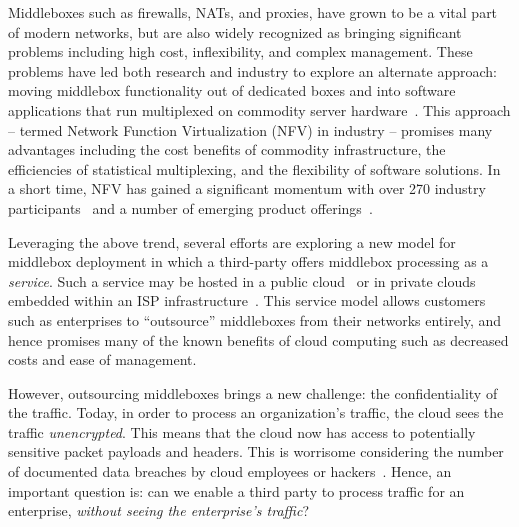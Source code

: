 




Middleboxes such as firewalls, NATs, and proxies, have grown to be a vital part of modern networks, but are 
also widely recognized as bringing significant problems including high cost, inflexibility, and complex management.  
These problems have led both research and industry to explore an alternate approach: moving middlebox functionality out of dedicated boxes and into 
software applications that run multiplexed on commodity server hardware~\cite{mb-manifesto,comb,aplomb,opennf,clickos,flowtags,etsi-nfv,domain20,opnfv}.
This approach -- termed Network Function Virtualization (NFV) in industry -- promises many advantages including the cost benefits of commodity infrastructure, 
the efficiencies of statistical multiplexing, and the flexibility of software solutions. 
In a short time, NFV has gained a significant momentum with over 270 industry participants~\cite{etsi-nfv} and a number of emerging product offerings~\cite{brocade,dell,juniper}.

Leveraging the above trend, several efforts are exploring a new model for middlebox deployment in which a third-party offers middlebox processing as a  
\emph{service}.
Such a service may be hosted in a public cloud~\cite{aplomb,zscaler,aryaka} or in private clouds embedded within an ISP 
infrastructure~\cite{domain20, telefonica}.  
This service model allows customers such as enterprises to ``outsource'' middleboxes from their networks entirely, and hence promises many of the known benefits of cloud computing  such as decreased costs and ease of management.%

However, outsourcing middleboxes brings a new challenge: the confidentiality of the traffic. 
Today, in order to process an organization's traffic, the cloud sees the traffic {\em unencrypted}.  This means that the cloud 
now has access to potentially sensitive packet payloads and headers. This is 
worrisome considering the number of documented data breaches by cloud employees or hackers~\cite{PrivacyRecords,databreach}.
Hence, an important question is: can we enable a third party to process traffic for an enterprise, {\em without seeing the enterprise's traffic}?

